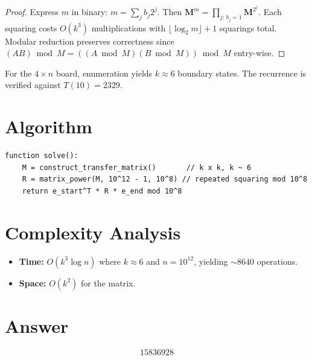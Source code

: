 \documentclass[12pt]{article}
\begin{document}
\begin{proof}
Express $m$ in binary: $m = \sum_j b_j 2^j$. Then $\mathbf{M}^m = \prod_{j:\, b_j=1} \mathbf{M}^{2^j}$. Each squaring costs $O(k^3)$ multiplications with $\lfloor\log_2 m\rfloor + 1$ squarings total. Modular reduction preserves correctness since $(AB)\bmod M = ((A\bmod M)(B\bmod M))\bmod M$ entry-wise.
\end{proof}

For the $4 \times n$ board, enumeration yields $k \approx 6$ boundary states. The recurrence is verified against $T(10) = 2329$.

\section{Algorithm}

\begin{verbatim}
function solve():
    M = construct_transfer_matrix()       // k x k, k ~ 6
    R = matrix_power(M, 10^12 - 1, 10^8) // repeated squaring mod 10^8
    return e_start^T * R * e_end mod 10^8
\end{verbatim}

\section{Complexity Analysis}
\begin{itemize}
    \item \textbf{Time:} $O(k^3 \log n)$ where $k \approx 6$ and $n = 10^{12}$, yielding $\sim 8640$ operations.
    \item \textbf{Space:} $O(k^2)$ for the matrix.
\end{itemize}

\section{Answer}

\[
\boxed{15836928}
\]
\end{document}
